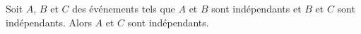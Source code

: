 Soit $A$, $B$ et $C$ des événements tels que $A$ et $B$ sont indépendants et $B$ et $C$ sont indépendants. Alors $A$ et $C$ sont indépendants.

\begin{reponses}
\end{reponses}

